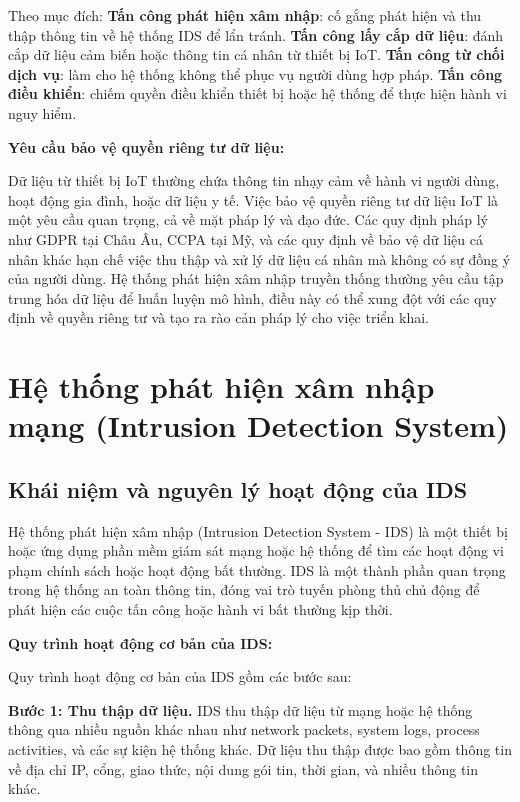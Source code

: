 Theo mục đích: \textbf{Tấn công phát hiện xâm nhập}: cố gắng phát hiện và thu thập thông tin về hệ thống IDS để lẩn tránh. \textbf{Tấn công lấy cắp dữ liệu}: đánh cắp dữ liệu cảm biến hoặc thông tin cá nhân từ thiết bị IoT. \textbf{Tấn công từ chối dịch vụ}: làm cho hệ thống không thể phục vụ người dùng hợp pháp. \textbf{Tấn công điều khiển}: chiếm quyền điều khiển thiết bị hoặc hệ thống để thực hiện hành vi nguy hiểm.

\textbf{Yêu cầu bảo vệ quyền riêng tư dữ liệu:}

Dữ liệu từ thiết bị IoT thường chứa thông tin nhạy cảm về hành vi người dùng, hoạt động gia đình, hoặc dữ liệu y tế. Việc bảo vệ quyền riêng tư dữ liệu IoT là một yêu cầu quan trọng, cả về mặt pháp lý và đạo đức. Các quy định pháp lý như GDPR tại Châu Âu, CCPA tại Mỹ, và các quy định về bảo vệ dữ liệu cá nhân khác hạn chế việc thu thập và xử lý dữ liệu cá nhân mà không có sự đồng ý của người dùng. Hệ thống phát hiện xâm nhập truyền thống thường yêu cầu tập trung hóa dữ liệu để huấn luyện mô hình, điều này có thể xung đột với các quy định về quyền riêng tư và tạo ra rào cản pháp lý cho việc triển khai.

\section{Hệ thống phát hiện xâm nhập mạng (Intrusion Detection System)}

\subsection{Khái niệm và nguyên lý hoạt động của IDS}
Hệ thống phát hiện xâm nhập (Intrusion Detection System - IDS) là một thiết bị hoặc ứng dụng phần mềm giám sát mạng hoặc hệ thống để tìm các hoạt động vi phạm chính sách hoặc hoạt động bất thường. IDS là một thành phần quan trọng trong hệ thống an toàn thông tin, đóng vai trò tuyến phòng thủ chủ động để phát hiện các cuộc tấn công hoặc hành vi bất thường kịp thời.

\textbf{Quy trình hoạt động cơ bản của IDS:}

Quy trình hoạt động cơ bản của IDS gồm các bước sau:

\textbf{Bước 1: Thu thập dữ liệu.} IDS thu thập dữ liệu từ mạng hoặc hệ thống thông qua nhiều nguồn khác nhau như network packets, system logs, process activities, và các sự kiện hệ thống khác. Dữ liệu thu thập được bao gồm thông tin về địa chỉ IP, cổng, giao thức, nội dung gói tin, thời gian, và nhiều thông tin khác.

